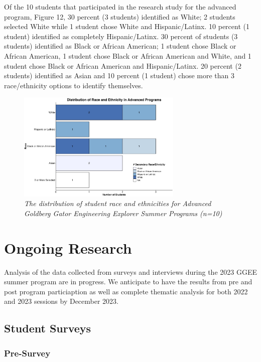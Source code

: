 \documentclass[
]{article}
\begin{document}
Of the 10 students that participated in the research study for the
advanced program, Figure 12, 30 percent (3 students) identified as
White; 2 students selected White while 1 student chose White and
Hispanic/Latinx. 10 percent (1 student) identified as completely
Hispanic/Latinx. 30 percent of students (3 students) identified as Black
or African American; 1 student chose Black or African American, 1
student chose Black or African American and White, and 1 student chose
Black or African American and Hispanic/Latinx. 20 percent (2 students)
identified as Asian and 10 percent (1 student) chose more than 3
race/ethnicity options to identify themselves.

\begin{figure}
\centering
\includegraphics[width=0.7\textwidth,height=\textheight]{Graphs/Report/GGEE_23_Race_Adv_Num.jpg}
\caption{\emph{The distribution of student race and ethnicities for
Advanced Goldberg Gator Engineering Explorer Summer Programs (n=10)}}
\end{figure}

\hypertarget{ongoing-research}{%
\section{Ongoing Research}\label{ongoing-research}}

Analysis of the data collected from surveys and interviews during the
2023 GGEE summer program are in progress. We anticipate to have the
results from pre and post program particiaption as well as complete
thematic analysis for both 2022 and 2023 sessions by December 2023.

\hypertarget{student-surveys}{%
\subsection{Student Surveys}\label{student-surveys}}

\hypertarget{pre-survey}{%
\subsubsection{Pre-Survey}\label{pre-survey}}
\end{document}
